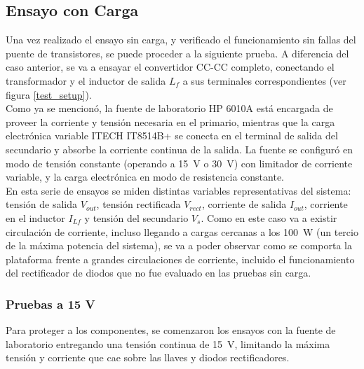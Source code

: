 \subsection{Ensayo con Carga}

Una vez realizado el ensayo sin carga, y verificado el funcionamiento sin fallas del puente de transistores, se puede proceder a la siguiente prueba. A diferencia del caso anterior, se va a ensayar el convertidor CC-CC completo, conectando el transformador y el inductor de salida $L_f$ a sus terminales correspondientes (ver figura \ref{test_setup}).\\

Como ya se mencionó, la fuente de laboratorio HP 6010A está encargada de proveer la corriente y tensión necesaria en el primario, mientras que la carga electrónica variable ITECH IT8514B+ se conecta en el terminal de salida del secundario y absorbe la corriente continua de la salida. La fuente se configuró en modo de tensión constante (operando a \SI[]{15}{\volt} o \SI[]{30}{\volt}) con limitador de corriente variable, y la carga electrónica en modo de resistencia constante.\\

En esta serie de ensayos se miden distintas variables representativas del sistema: tensión de salida $V_{out}$, tensión rectificada $V_{rect}$, corriente de salida $I_{out}$, corriente en el inductor $I_{Lf}$ y tensión del secundario $V_s$. Como en este caso va a existir circulación de corriente, incluso llegando a cargas cercanas a los \SI[]{100}{\watt} (un tercio de la máxima potencia del sistema), se va a poder observar como se comporta la plataforma frente a grandes circulaciones de corriente, incluido el funcionamiento del rectificador de diodos que no fue evaluado en las pruebas sin carga.\\

\subsubsection{Pruebas a 15 V}

Para proteger a los componentes, se comenzaron los ensayos con la fuente de laboratorio entregando una tensión continua de \SI[]{15}{\volt}, limitando la máxima tensión y corriente que cae sobre las llaves y diodos rectificadores.


